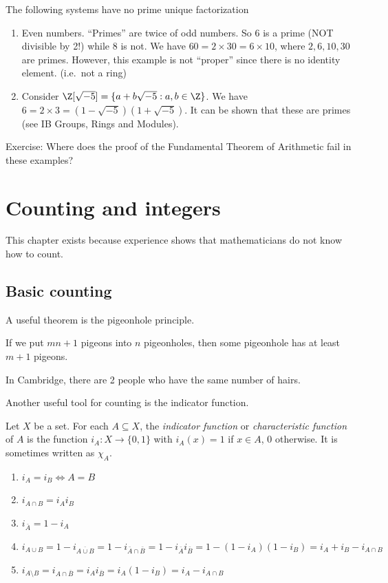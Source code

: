 \documentclass[a4paper]{article}
\begin{document}
\begin{eg}
  The following systems have no prime unique factorization
  \begin{enumerate}
    \item Even numbers. ``Primes'' are twice of odd numbers. So 6 is a prime (NOT divisible by 2!) while 8 is not. We have $60 = 2\times 30 = 6\times 10$, where $2, 6, 10, 30$ are primes. However, this example is not ``proper'' since there is no identity element. (i.e.\ not a ring)
    \item Consider $\Z[\sqrt{-5}] = \{a + b\sqrt{-5} : a, b\in \Z\}$. We have $6 = 2\times 3 = (1 - \sqrt{-5})(1 + \sqrt{-5})$. It can be shown that these are primes (see IB Groups, Rings and Modules).
  \end{enumerate}
\end{eg}
Exercise: Where does the proof of the Fundamental Theorem of Arithmetic fail in these examples?

\section{Counting and integers}
This chapter exists because experience shows that mathematicians do not know how to count.

\subsection{Basic counting}
A useful theorem is the pigeonhole principle.
\begin{thm}
  If we put $mn + 1$ pigeons into $n$ pigeonholes, then some pigeonhole has at least $m + 1$ pigeons.
\end{thm}

\begin{eg}
  In Cambridge, there are 2 people who have the same number of hairs.
\end{eg}

Another useful tool for counting is the indicator function.
\begin{defi}
  Let $X$ be a set. For each $A\subseteq X$, the \emph{indicator function} or \emph{characteristic function} of $A$ is the function $i_A: X\to \{0, 1\}$ with $i_A(x) = 1$ if $x\in A$, $0$ otherwise. It is sometimes written as $\chi_A$.
\end{defi}
\begin{prop}\leavevmode
  \begin{enumerate}
    \item $i_A = i_B \Leftrightarrow A = B$
    \item $i_{A\cap B} = i_A i_B$
    \item $i_{\bar{A}} = 1 - i_A$
    \item $i_{A\cup B} = 1 - i_{\overline{A\cup B}} = 1 - i_{\bar A\cap \bar B} = 1 - i_{\bar{A}}i_{\bar{B}} = 1 - (1 - i_A)(1 - i_B) = i_A + i_B - i_{A\cap B}$
    \item $i_{A\setminus B} = i_{A\cap \bar B} = i_Ai_{\bar B} = i_A(1 - i_B) = i_A - i_{A\cap B}$
  \end{enumerate}
\end{prop}
\end{document}
